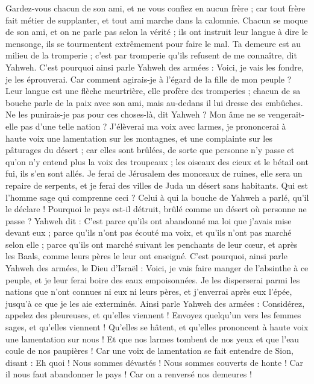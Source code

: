 \begin{multicols}{2}
Gardez-vous chacun de son ami, et ne vous confiez en aucun frère ; car tout frère fait métier de supplanter, et tout ami marche dans la calomnie.
Chacun se moque de son ami, et on ne parle pas selon la vérité ; ils ont instruit leur langue à dire le mensonge, ils se tourmentent extrêmement pour faire le mal.
Ta demeure est au milieu de la tromperie ; c'est par tromperie qu'ils refusent de me connaître, dit Yahweh.
C'est pourquoi ainsi parle Yahweh des armées : Voici, je vais les fondre, je les éprouverai. Car comment agirais-je à l'égard de la fille de mon peuple ?
Leur langue est une flèche meurtrière, elle profère des tromperies ; chacun de sa bouche parle de la paix avec son ami, mais au-dedans il lui dresse des embûches.
Ne les punirais-je pas pour ces choses-là, dit Yahweh ? Mon âme ne se vengerait-elle pas d'une telle nation ?
J'élèverai ma voix avec larmes, je prononcerai à haute voix une lamentation sur les montagnes, et une complainte sur les pâturages du désert ; car elles sont brûlées, de sorte que personne n'y passe et qu'on n'y entend plus la voix des troupeaux ; les oiseaux des cieux et le bétail ont fui, ils s'en sont allés.
Je ferai de Jérusalem des monceaux de ruines, elle sera un repaire de serpents, et je ferai des villes de Juda un désert sans habitants.
Qui est l'homme sage qui comprenne ceci ? Celui à qui la bouche de Yahweh a parlé, qu'il le déclare ! Pourquoi le pays est-il détruit, brûlé comme un désert où personne ne passe ?
Yahweh dit : C'est parce qu'ils ont abandonné ma loi que j'avais mise devant eux ; parce qu'ils n'ont pas écouté ma voix, et qu'ils n'ont pas marché selon elle ;
parce qu'ils ont marché suivant les penchants de leur cœur, et après les Baals, comme leurs pères le leur ont enseigné.
C'est pourquoi, ainsi parle Yahweh des armées, le Dieu d'Israël : Voici, je vais faire manger de l'absinthe à ce peuple, et je leur ferai boire des eaux empoisonnées.
Je les disperserai parmi les nations que n'ont connues ni eux ni leurs pères, et j'enverrai après eux l'épée, jusqu'à ce que je les aie exterminés.
Ainsi parle Yahweh des armées : Considérez, appelez des pleureuses, et qu'elles viennent ! Envoyez quelqu'un vers les femmes sages, et qu'elles viennent !
Qu'elles se hâtent, et qu'elles prononcent à haute voix une lamentation sur nous ! Et que nos larmes tombent de nos yeux et que l'eau coule de nos paupières !
Car une voix de lamentation se fait entendre de Sion, disant : Eh quoi ! Nous sommes dévastés ! Nous sommes couverts de honte ! Car il nous faut abandonner le pays ! Car on a renversé nos demeures !

\end{multicols}

